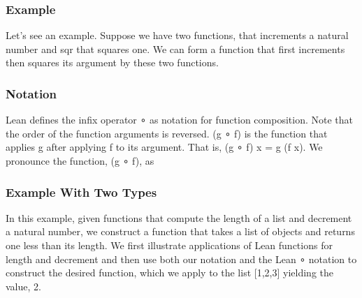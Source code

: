 \documentclass[letterpaper,10pt,english]{sphinxmanual}
\begin{document}
\subsubsection{Example}
\label{\detokenize{A_03_Recursive_Types:example}}
\sphinxAtStartPar
Let’s see an example. Suppose we have two functions, 
that increments a natural number and sqr that squares one.
We can form a function that first increments then squares
its argument by  these two functions.

\begin{sphinxVerbatim}[commandchars=\\\{\}]
        
        
     
          
\end{sphinxVerbatim}


\subsubsection{Notation}
\label{\detokenize{A_03_Recursive_Types:notation}}
\sphinxAtStartPar
Lean defines the infix operator ∘ as notation for function
composition. Note that the order of the function arguments
is reversed. (g ∘ f) is the function that applies g after
applying f to its argument. That is, (g ∘ f) x = g (f x).
We pronounce the function, (g ∘ f), as 

\begin{sphinxVerbatim}[commandchars=\\\{\}]
             
        
\end{sphinxVerbatim}


\subsubsection{Example With Two Types}
\label{\detokenize{A_03_Recursive_Types:example-with-two-types}}
\sphinxAtStartPar
In this example, given functions that compute the length
of a list and decrement a natural number, we construct a
function that takes a list of objects and returns one less
than its length. We first illustrate applications of Lean
functions for length and decrement and then use both our
notation and the Lean ∘ notation to construct the desired
function, which we apply to the list {[}1,2,3{]} yielding the
value, 2.
\end{document}
